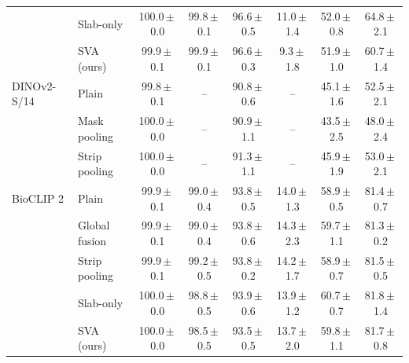 \begin{tabular}{llcccccc}
 & Slab-only & 100.0\,$\pm$\,0.0 & 99.8\,$\pm$\,0.1 & 96.6\,$\pm$\,0.5 & 11.0\,$\pm$\,1.4 & 52.0\,$\pm$\,0.8 & 64.8\,$\pm$\,2.1 \\
 & SVA (ours) & 99.9\,$\pm$\,0.1 & 99.9\,$\pm$\,0.1 & 96.6\,$\pm$\,0.3 & 9.3\,$\pm$\,1.8 & 51.9\,$\pm$\,1.0 & 60.7\,$\pm$\,1.4 \\
\midrule
DINOv2-S/14 & Plain & 99.8\,$\pm$\,0.1 & -- & 90.8\,$\pm$\,0.6 & -- & 45.1\,$\pm$\,1.6 & 52.5\,$\pm$\,2.1 \\
 & Mask pooling & 100.0\,$\pm$\,0.0 & -- & 90.9\,$\pm$\,1.1 & -- & 43.5\,$\pm$\,2.5 & 48.0\,$\pm$\,2.4 \\
 & Strip pooling & 100.0\,$\pm$\,0.0 & -- & 91.3\,$\pm$\,1.1 & -- & 45.9\,$\pm$\,1.9 & 53.0\,$\pm$\,2.1 \\
\midrule
BioCLIP 2 & Plain & 99.9\,$\pm$\,0.1 & 99.0\,$\pm$\,0.4 & 93.8\,$\pm$\,0.5 & 14.0\,$\pm$\,1.3 & 58.9\,$\pm$\,0.5 & 81.4\,$\pm$\,0.7 \\
 & Global fusion & 99.9\,$\pm$\,0.1 & 99.0\,$\pm$\,0.4 & 93.8\,$\pm$\,0.6 & 14.3\,$\pm$\,2.3 & 59.7\,$\pm$\,1.1 & 81.3\,$\pm$\,0.2 \\
 & Strip pooling & 99.9\,$\pm$\,0.1 & 99.2\,$\pm$\,0.5 & 93.8\,$\pm$\,0.2 & 14.2\,$\pm$\,1.7 & 58.9\,$\pm$\,0.7 & 81.5\,$\pm$\,0.5 \\
 & Slab-only & 100.0\,$\pm$\,0.0 & 98.8\,$\pm$\,0.5 & 93.9\,$\pm$\,0.6 & 13.9\,$\pm$\,1.2 & 60.7\,$\pm$\,0.7 & 81.8\,$\pm$\,1.4 \\
 & SVA (ours) & 100.0\,$\pm$\,0.0 & 98.5\,$\pm$\,0.5 & 93.5\,$\pm$\,0.5 & 13.7\,$\pm$\,2.0 & 59.8\,$\pm$\,1.1 & 81.7\,$\pm$\,0.8 \\
\bottomrule
\end{tabular}